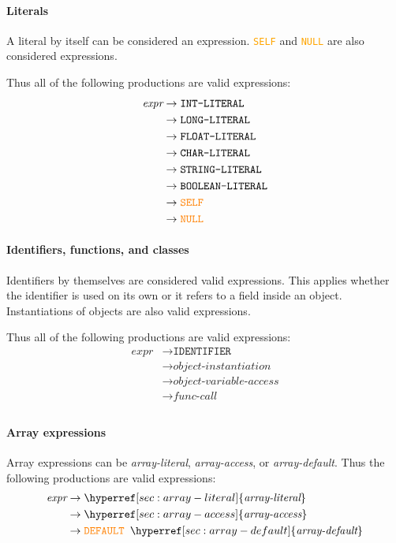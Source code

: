 \documentclass{article}
\begin{document}
\paragraph{Literals}
A literal by itself can be considered an expression. \textcolor{orange}{\texttt{SELF}} and \textcolor{orange}{\texttt{NULL}} are also considered expressions.

Thus all of the following productions are valid expressions:
\begin{align*}
    \textit{expr} &\to \texttt{INT-LITERAL} \\
    &\to \texttt{LONG-LITERAL} \\
    &\to \texttt{FLOAT-LITERAL} \\
    &\to \texttt{CHAR-LITERAL} \\
    &\to \texttt{STRING-LITERAL} \\
    &\to \texttt{BOOLEAN-LITERAL} \\
    &\to \textcolor{orange}{\texttt{SELF}} \\
    &\to \textcolor{orange}{\texttt{NULL}} \\
\end{align*}

\paragraph{Identifiers, functions, and classes}
Identifiers by themselves are considered valid expressions. This applies whether the identifier is used on its own or it refers to a field inside an object. Instantiations of objects are also valid expressions.

Thus all of the following productions are valid expressions:
\begin{align*}
    \textit{expr} &\to \texttt{IDENTIFIER} \\
    &\to \hyperref[sec:object-instantiation]{\textit{object-instantiation}} \\
    &\to \hyperref[sec:object-variable-access]{\textit{object-variable-access}} \\
    &\to \hyperref[sec:func-call]{\textit{func-call}} \\
\end{align*}

\paragraph{Array expressions}
Array expressions can be \textit{array-literal}, \textit{array-access}, or \textit{array-default}. Thus the following productions are valid expressions:
\begin{align*}
    \textit{expr} &\to \hyperref[sec:array-literal]{\textit{array-literal}} \\
    &\to \hyperref[sec:array-access]{\textit{array-access}} \\
    &\to \textcolor{orange}{\texttt{DEFAULT}} \texttt{ } \hyperref[sec:array-default]{\textit{array-default}} \\
\end{align*}
\end{document}
